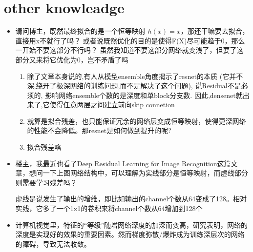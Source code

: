 \documentclass[12pt]{ctexart}%
\begin{document}
	\section{\quad other knowleadge}
		\begin{itemize}	
			\item 请问博主，既然最终拟合的是一个恒等映射 $h(x)=x$，那还干嘛要去拟合，直接用x不就行了吗？ 或者说既然优化的目的是使得F(X)尽可能趋于0，那么一开始不要这部分不行吗？ 虽然我知道不要这部分网络就变浅了，但要了这部分又来将它优化为0，岂不矛盾了吗
				\begin{enumerate}
					\item 除了文章本身说的,有人从模型ensemble角度揭示了resnet的本质 (它并不深,绕开了极深网络的训练问题,而不是解决了这个问题), 说Residual不是必须的, 影响网络ensemble个数的是深度和单block分支数. 因此,densenet就出来了,它使得任意两层之间建立前向skip connetion
					
					\item 就算是拟合残差，也只能保证冗余的网络层变成恒等映射，使得更深网络的性能不会降低。那resnet是如何做到提升的呢?
					
					\item 拟合残差咯
				\end{enumerate}
				
			\item 楼主，我最近也看了Deep Residual Learning for Image Recognition这篇文章，想问一下上图网络结构中，可以理解为实线部分是恒等映射，而虚线部分则需要学习残差吗？ 
			
			虚线是说发生了输出的增维，即比如输出的channel个数从64变成了128。相对实线，它多了一个1x1的卷积来将channel个数从64增加到128个
			
			\item 计算机视觉里，特征的“等级”随增网络深度的加深而变高，研究表明，网络的深度是实现好的效果的重要因素。然而梯度弥散/爆炸成为训练深层次的网络的障碍，导致无法收敛。
			

\end{itemize}
\end{document}
